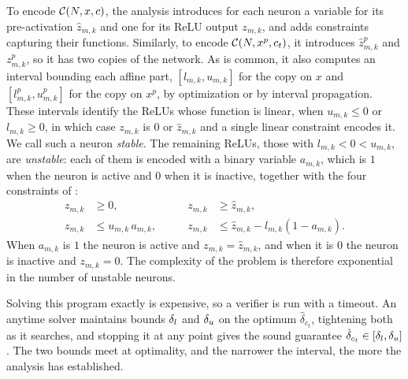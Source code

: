 To encode $\mathcal{C}(N,x,c)$, the analysis introduces for each neuron a
variable for its pre-activation $\hat{z}_{m,k}$ and one for its ReLU
output $z_{m,k}$, and adds constraints capturing their functions.
Similarly, to encode $\mathcal{C}(N,x^{p},c_t)$, it introduces
$\hat{z}^{p}_{m,k}$ and $z^{p}_{m,k}$, so it has two copies of the
network. As is common, it also computes an interval bounding each
affine part, $[l_{m,k}, u_{m,k}]$ for the copy on $x$ and
$[l^{p}_{m,k}, u^{p}_{m,k}]$ for the copy on $x^{p}$, by optimization or
by interval propagation. These intervals identify the ReLUs whose
function is linear, when $u_{m,k} \leq 0$ or $l_{m,k} \geq 0$, in
which case $z_{m,k}$ is $0$ or $\hat{z}_{m,k}$ and a single linear
constraint encodes it. We call such a neuron \emph{stable}. The
remaining ReLUs, those with $l_{m,k} < 0 < u_{m,k}$, are
\emph{unstable}: each of them is encoded with a
binary variable $a_{m,k}$, which is $1$ when the neuron is active and
$0$ when it is inactive, together with the four constraints of
\citet{tjeng2019}:
\begin{equation}
\begin{aligned}
  z_{m,k} &\geq 0, &\qquad
  z_{m,k} &\geq \hat{z}_{m,k}, \\
  z_{m,k} &\leq u_{m,k}\, a_{m,k}, &\qquad
  z_{m,k} &\leq \hat{z}_{m,k} - l_{m,k}(1 - a_{m,k}).
\end{aligned}
\label{eq:relu-encoding}
\end{equation}
When $a_{m,k}$ is $1$ the neuron is active and
$z_{m,k} = \hat{z}_{m,k}$, and when it is $0$ the neuron is inactive
and $z_{m,k} = 0$. The complexity of the problem is therefore
exponential in the number of unstable neurons.

Solving this program exactly is expensive, so a verifier is run with a
timeout. An anytime solver maintains bounds $\delta_l$ and $\delta_u$ on the
optimum $\hat{\delta}_{c_t}$, tightening both as it searches, and
stopping it at any point gives the sound guarantee
$\hat{\delta}_{c_t} \in [\delta_l, \delta_u]$. The two bounds meet at
optimality, and the narrower the interval, the more the analysis has
established.
